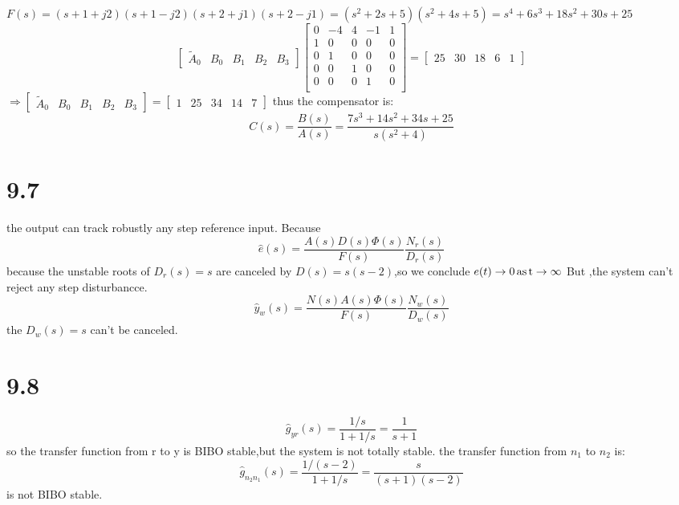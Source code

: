 \documentclass{article}
\begin{document}
$F(s)=(s+1+j2)(s+1-j2)(s+2+j1)(s+2-j1)=(s^2+2s+5)(s^2+4s+5)=s^4+6s^3+18s^2+30s+25$\\
\[ 
    \left[ 
        \begin{array}{ccccc}
            \tilde{A}_0 & B_0 & B_1 & B_2 & B_3
        \end{array}
    \right]
    \left[ 
        \begin{array}{ccccc}
            0 & -4 & 4 & -1 & 1\\
            1 & 0 & 0 & 0 & 0\\
            0 & 1 & 0 & 0 & 0\\
            0 & 0 & 1 & 0 & 0\\
            0 & 0 & 0 & 1 & 0\\
        \end{array}
    \right]=\left[ 
        \begin{array}{ccccc}
            25 & 30 & 18 & 6 &1
        \end{array}
    \right]    
    \] 
    $\Rightarrow     \left[ 
        \begin{array}{ccccc}
            \tilde{A}_0 & B_0 & B_1 & B_2 & B_3
        \end{array}
    \right]=    \left[ 
        \begin{array}{ccccc}
           1 & 25 & 34 & 14 & 7
        \end{array}
    \right]$
    thus the compensator is:
    \[C(s)=\frac{B(s)}{A(s)}=\frac{7s^3+14s^2+34s+25}{s(s^2+4)}\]

\section*{9.7}
the output can track robustly any step reference input.
Because 
\[ 
\hat{e}(s)=\frac{A(s)D(s)\Phi(s)}{F(s)}\frac{N_r(s)}{D_r(s)}    
\]
because the unstable roots of $D_r(s)=s$ are canceled by $D(s)=s(s-2)$,so we conclude $e(t)\rightarrow 0 \,\rm{as} \, t\rightarrow \infty$
But ,the system can't reject any step disturbancce.
\[
\hat{y}_w(s)=\frac{N(s)A(s)\Phi(s)}{F(s)}\frac{N_w(s)}{D_w(s)}    
\]
the $D_w(s)=s$ can't be canceled.

\section*{9.8}
\[ 
    \hat{g}_{yr}(s)=\frac{1/s}{1+1/s}=\frac{1}{s+1}
    \]
so the transfer function from r to y is BIBO stable,but the system is not totally stable.
the transfer function from $n_1$ to $n_2$ is:
\[
\hat{g}_{n_2n_1}(s)=\frac{1/(s-2)}{1+1/s}=\frac{s}{(s+1)(s-2)}    
\]
is not BIBO stable.
\end{document}
